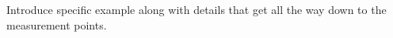 
Introduce specific example along with details that get all the way down to the measurement points.



